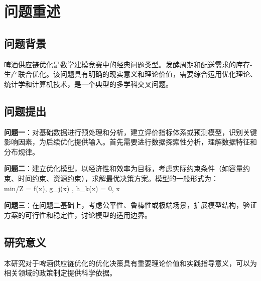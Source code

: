 \newpage
\section{问题重述}

\subsection{问题背景}
啤酒供应链优化是数学建模竞赛中的经典问题类型。发酵周期和配送需求的库存-生产联合优化。该问题具有明确的现实意义和理论价值，需要综合运用优化理论、统计学和计算机技术，是一个典型的多学科交叉问题。

\subsection{问题提出}
\textbf{问题一}：对基础数据进行预处理和分析，建立评价指标体系或预测模型，识别关键影响因素，为后续优化提供输入。首先需要进行数据探索性分析，理解数据特征和分布规律。

\textbf{问题二}：建立优化模型，以经济性和效率为目标，考虑实际约束条件（如容量约束、时间约束、资源约束），求解最优决策方案。模型的一般形式为：
\\min/\max \quad Z = f(x), \quad {} \quad g_j(x) , \; h_k(x) = 0, \; x \in {}

\textbf{问题三}：在问题二基础上，考虑公平性、鲁棒性或极端场景，扩展模型结构，验证方案的可行性和稳定性，讨论模型的适用边界。

\subsection{研究意义}
本研究对于啤酒供应链优化的优化决策具有重要理论价值和实践指导意义，可以为相关领域的政策制定提供科学依据。
